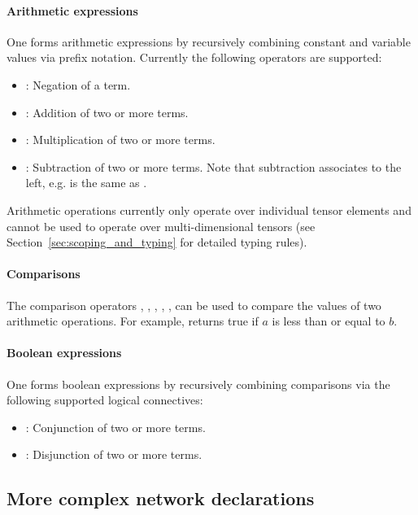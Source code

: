 \paragraph{Arithmetic expressions}

One forms arithmetic expressions by recursively combining constant and variable values via prefix notation. Currently the following operators are supported:
\begin{itemize}
	\item {}: Negation of a term.
    \item {}: Addition of two or more terms. 
    \item {}: Multiplication of two or more terms. 
    \item {}: Subtraction of two or more terms. Note that subtraction associates to the left, e.g.  is the same as  .
\end{itemize}
Arithmetic operations currently only operate over individual tensor elements and cannot be used to operate over multi-dimensional tensors (see Section~\ref{sec:scoping_and_typing} for detailed typing rules).

\paragraph{Comparisons}

The comparison operators \inlinevnn{<=}, \inlinevnn{>=}, \inlinevnn{<}, \inlinevnn{>}, \inlinevnn{=}, \inlinevnn{!=} can be used to compare the values of two arithmetic operations.
For example,  returns true if $a$ is less than or equal to $b$.
    
\paragraph{Boolean expressions} 

One forms boolean expressions by recursively combining comparisons via the following supported logical connectives:
\begin{itemize}
    \item {}: Conjunction of two or more terms.
    \item {}: Disjunction of two or more terms.
\end{itemize}

\subsection{More complex network declarations}
\label{sec:complex-networks-decls}

